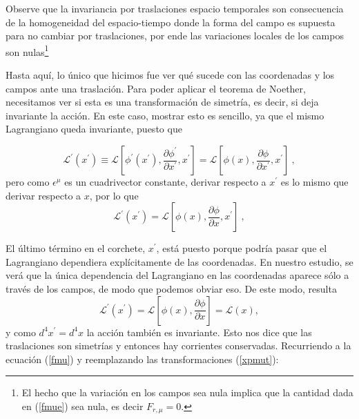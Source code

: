 Observe que la invariancia por traslaciones espacio temporales son consecuencia de la homogeneidad del espacio-tiempo donde la forma del campo es supuesta para no cambiar por traslaciones, por ende las variaciones locales de los campos son nulas\footnote{El hecho que la variación en los campos sea nula implica que la cantidad dada en (\ref{fmue}) sea nula, es decir $F_{r,\mu}=0$.}


\noindent
Hasta aquí, lo único que hicimos fue ver qué sucede con las coordenadas y los campos ante una traslación. Para poder aplicar el teorema de Noether, necesitamos ver si esta es una transformación de simetría, es decir, si deja invariante la acción. En este caso, mostrar esto es sencillo, ya que el mismo Lagrangiano queda invariante, puesto que 

\begin{equation}
    \mathcal{L}^{\prime}\left(x^{\prime}\right) \equiv \mathcal{L}\left[\phi^{\prime}\left(x^{\prime}\right), \frac{\partial \phi^{\prime}}{\partial x^{\prime}}, x^{\prime}\right]=\mathcal{L}\left[\phi(x), \frac{\partial \phi}{\partial x^{\prime}}, x^{\prime}\right]~,
\end{equation}
\noindent
pero como $\epsilon^{\mu}$ es un cuadrivector constante, derivar respecto a $x^{\prime}$ es lo mismo que derivar respecto a $x$, por lo que
\begin{equation}
    \mathcal{L}^{\prime}\left(x^{\prime}\right)=\mathcal{L}\left[\phi(x), \frac{\partial \phi}{\partial x}, x^{\prime}\right]~,
\end{equation}

\noindent
El último término en el corchete, $x^{\prime}$, está puesto porque podría pasar que el Lagrangiano dependiera explícitamente de las coordenadas. En nuestro estudio, se verá que la única dependencia del Lagrangiano en las coordenadas aparece sólo a través de los campos, de modo que podemos obviar eso. De este modo, resulta
\begin{equation}
    \mathcal{L}^{\prime}\left(x^{\prime}\right)=\mathcal{L}\left[\phi(x), \frac{\partial \phi}{\partial x}\right]=\mathcal{L}(x),
\end{equation}
y como $d^{4} x^{\prime}=d^{4} x$ la acción también es invariante. Esto nos dice que las traslaciones son simetrías y entonces hay corrientes conservadas. Recurriendo a la ecuación (\ref{fmu}) y reemplazando las transformaciones (\ref{xpmut}):


